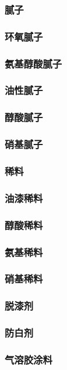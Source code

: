 \documentclass[UTF8]{../../ApplicationUniverse}
\begin{document}
\subsubsection{腻子}
    \subsubsection{环氧腻子}
    \subsubsection{氨基醇酸腻子}
    \subsubsection{油性腻子}
    \subsubsection{醇酸腻子}
    \subsubsection{硝基腻子}
\subsubsection{稀料}
    \subsubsection{油漆稀料}
    \subsubsection{醇酸稀料}
    \subsubsection{氨基稀料}
    \subsubsection{硝基稀料}
    \subsubsection{脱漆剂}
    \subsubsection{防白剂}
    \subsubsection{气溶胶涂料}
\end{document}
